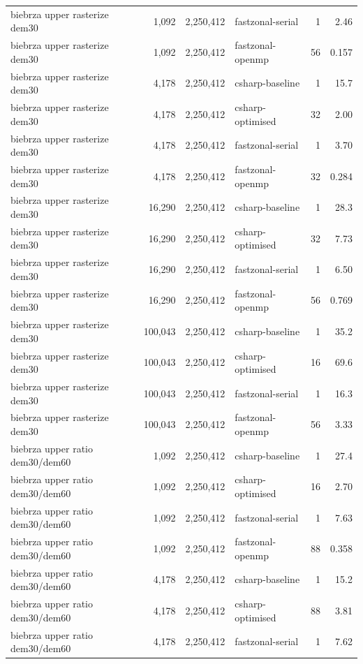 \begin{tabular}{lrrlrr}
biebrza upper rasterize dem30 & 1,092 & 2,250,412 & fastzonal-serial & 1 & 2.46 \\
biebrza upper rasterize dem30 & 1,092 & 2,250,412 & fastzonal-openmp & 56 & 0.157 \\
biebrza upper rasterize dem30 & 4,178 & 2,250,412 & csharp-baseline & 1 & 15.7 \\
biebrza upper rasterize dem30 & 4,178 & 2,250,412 & csharp-optimised & 32 & 2.00 \\
biebrza upper rasterize dem30 & 4,178 & 2,250,412 & fastzonal-serial & 1 & 3.70 \\
biebrza upper rasterize dem30 & 4,178 & 2,250,412 & fastzonal-openmp & 32 & 0.284 \\
biebrza upper rasterize dem30 & 16,290 & 2,250,412 & csharp-baseline & 1 & 28.3 \\
biebrza upper rasterize dem30 & 16,290 & 2,250,412 & csharp-optimised & 32 & 7.73 \\
biebrza upper rasterize dem30 & 16,290 & 2,250,412 & fastzonal-serial & 1 & 6.50 \\
biebrza upper rasterize dem30 & 16,290 & 2,250,412 & fastzonal-openmp & 56 & 0.769 \\
biebrza upper rasterize dem30 & 100,043 & 2,250,412 & csharp-baseline & 1 & 35.2 \\
biebrza upper rasterize dem30 & 100,043 & 2,250,412 & csharp-optimised & 16 & 69.6 \\
biebrza upper rasterize dem30 & 100,043 & 2,250,412 & fastzonal-serial & 1 & 16.3 \\
biebrza upper rasterize dem30 & 100,043 & 2,250,412 & fastzonal-openmp & 56 & 3.33 \\
biebrza upper ratio dem30/dem60 & 1,092 & 2,250,412 & csharp-baseline & 1 & 27.4 \\
biebrza upper ratio dem30/dem60 & 1,092 & 2,250,412 & csharp-optimised & 16 & 2.70 \\
biebrza upper ratio dem30/dem60 & 1,092 & 2,250,412 & fastzonal-serial & 1 & 7.63 \\
biebrza upper ratio dem30/dem60 & 1,092 & 2,250,412 & fastzonal-openmp & 88 & 0.358 \\
biebrza upper ratio dem30/dem60 & 4,178 & 2,250,412 & csharp-baseline & 1 & 15.2 \\
biebrza upper ratio dem30/dem60 & 4,178 & 2,250,412 & csharp-optimised & 88 & 3.81 \\
biebrza upper ratio dem30/dem60 & 4,178 & 2,250,412 & fastzonal-serial & 1 & 7.62 \\

\end{tabular}
